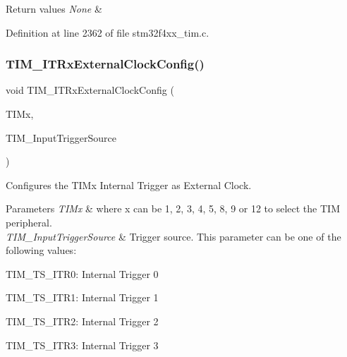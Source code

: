 \begin{DoxyRetVals}{Return values}
{\em None} & \\
\hline
\end{DoxyRetVals}


Definition at line 2362 of file stm32f4xx\+\_\+tim.\+c.

\mbox{\label{group___t_i_m_gabef227d21d9e121e6a4ec5ab6223f5a9}} 
\subsubsection{\texorpdfstring{T\+I\+M\+\_\+\+I\+T\+Rx\+External\+Clock\+Config()}{TIM\_ITRxExternalClockConfig()}}
{\footnotesize\ttfamily void T\+I\+M\+\_\+\+I\+T\+Rx\+External\+Clock\+Config (\begin{DoxyParamCaption}\item[{\hyperlink{struct_t_i_m___type_def}{T\+I\+M\+\_\+\+Type\+Def} $\ast$}]{T\+I\+Mx,  }\item[{uint16\+\_\+t}]{T\+I\+M\+\_\+\+Input\+Trigger\+Source }\end{DoxyParamCaption})}



Configures the T\+I\+Mx Internal Trigger as External Clock. 


\begin{DoxyParams}{Parameters}
{\em T\+I\+Mx} & where x can be 1, 2, 3, 4, 5, 8, 9 or 12 to select the T\+IM peripheral. \\
\hline
{\em T\+I\+M\+\_\+\+Input\+Trigger\+Source} & Trigger source. This parameter can be one of the following values\+: \begin{DoxyItemize}
\item T\+I\+M\+\_\+\+T\+S\+\_\+\+I\+T\+R0\+: Internal Trigger 0 \item T\+I\+M\+\_\+\+T\+S\+\_\+\+I\+T\+R1\+: Internal Trigger 1 \item T\+I\+M\+\_\+\+T\+S\+\_\+\+I\+T\+R2\+: Internal Trigger 2 \item T\+I\+M\+\_\+\+T\+S\+\_\+\+I\+T\+R3\+: Internal Trigger 3 \end{DoxyItemize}
\\
\hline
\end{DoxyParams}

